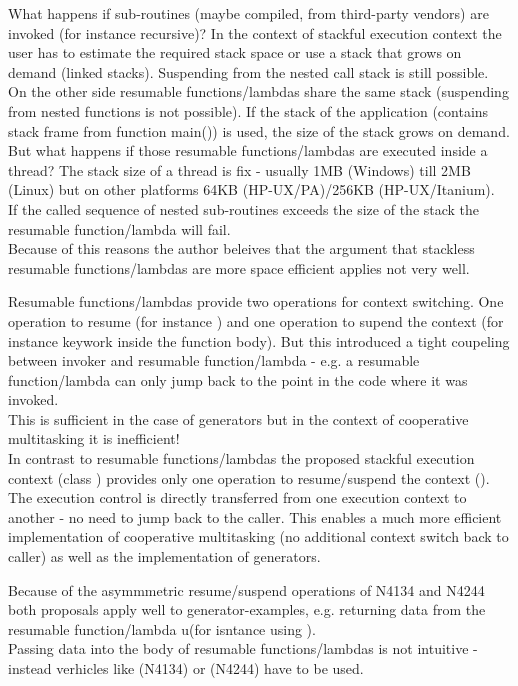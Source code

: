 What happens if sub-routines (maybe compiled, from third-party vendors) are
invoked (for instance recursive)? In the context of stackful execution context
the user has to estimate the required stack space or use a stack that grows on
demand (linked stacks). Suspending from the nested call stack is still
possible.\\
On the other side resumable functions/lambdas share the same stack (suspending
from nested functions is not possible). If the stack of the application
(contains stack frame from function main()) is used, the size of the stack grows
on demand. But what happens if those resumable functions/lambdas are executed
inside a thread? The stack size of a thread is fix - usually 1MB (Windows) till
2MB (Linux) but on other platforms 64KB (HP-UX/PA)/256KB (HP-UX/Itanium).\\
If the called sequence of nested sub-routines exceeds the size of the stack the
resumable function/lambda will fail.\\
\newline
Because of this reasons the author beleives that the argument that stackless
resumable functions/lambdas are more space efficient applies not very well.

Resumable functions/lambdas provide two operations for context switching. One
operation to resume (for instance \rlop) and one
operation to supend the context (for instance keywork \yield inside the function
body). But this introduced a tight coupeling between invoker and resumable
function/lambda - e.g. a resumable function/lambda can only jump back to the
point in the code where it was invoked.\\
This is sufficient in the case of generators but in the context of cooperative
multitasking it is inefficient!\\
In contrast to resumable functions/lambdas the proposed stackful execution
context (class \ectx) provides only one operation to resume/suspend
the context (\ectxop). The execution control is directly transferred from one
execution context to another - no need to jump back to the caller. This enables
a much more efficient implementation of cooperative multitasking (no additional
context switch back to caller) as well as the implementation of generators.

Because of the asymmmetric resume/suspend operations of N4134 and N4244 both
proposals apply well to generator-examples, e.g. returning data from the
resumable function/lambda u(for isntance using \yield).\\
Passing data into the body of resumable functions/lambdas is not intuitive -
instead verhicles like  (N4134)
or  (N4244)
have to be used.\\


